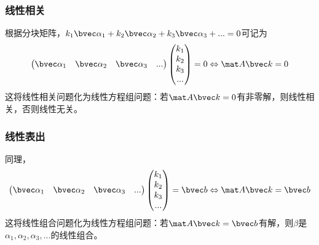 \subsubsection{线性相关}
根据分块矩阵，$k_1 \bvec \alpha_1+k_2 \bvec \alpha_2+k_3 \bvec \alpha_3+...=0$可记为
$$
\begin{pmatrix}
\bvec \alpha_1& \bvec \alpha_2& \bvec \alpha_3&...
\end{pmatrix}
\begin{pmatrix}
k_{1}\\
k_{2}\\
k_{3}\\
...\\
\end{pmatrix}
=
0
\Leftrightarrow 
\mat A \bvec k = 0
$$
这将线性相关问题化为线性方程组问题：若$\mat A \bvec k = 0$有非零解，则线性相关，否则线性无关。

\subsubsection{线性表出}
同理，
$$
\begin{pmatrix}
\bvec \alpha_1& \bvec \alpha_2& \bvec \alpha_3&...
\end{pmatrix}
\begin{pmatrix}
k_{1}\\
k_{2}\\
k_{3}\\
...\\
\end{pmatrix}
=
\bvec b
\Leftrightarrow 
\mat A \bvec k = \bvec b
$$
这将线性组合问题化为线性方程组问题：若$\mat A \bvec k = \bvec b$有解，则$\beta$是$\alpha_1, \alpha_2,\alpha_3,...$的线性组合。

